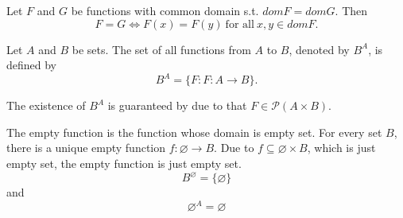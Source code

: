 \begin{theorem}{}{}
    Let $F$ and $G$ be functions with common domain s.t. $domF = domG$. Then
    \[
        F = G \iff F(x) = F(y) \ \text{for all}\ x, y \in domF.
    \]
\end{theorem}

\begin{definition}{}{}
    Let $A$ and $B$ be sets. The set of all functions from $A$ to $B$,
    denoted by $B^A$, is defined by
    \[
        B^A = \{ F : F : A \to B \}.
    \]
\end{definition}

\begin{remarks}
    The existence of $B^{A}$ is guaranteed by  due to that
    $F \in \mathcal{P}(A \times B) $.
\end{remarks}

\begin{examples}
    The empty function is the function whose domain is empty set. For
    every set $B$, there is a unique empty function $f: \varnothing \to
    B$. Due to $f \subseteq \varnothing \times B$, which is just empty
    set,  the empty function is just empty set.
    \[
        B^{\varnothing} = \{\varnothing\}
    \]
    and
    \[
        \varnothing^A = \varnothing
    \]
\end{examples}


